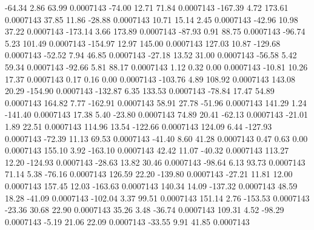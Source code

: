       -64.34        2.86       63.99     0.0007143
      -74.00       12.71       71.84     0.0007143
     -167.39        4.72      173.61     0.0007143
       37.85       11.86      -28.88     0.0007143
       10.71       15.14        2.45     0.0007143
      -42.96       10.98       37.22     0.0007143
     -173.14        3.66      173.89     0.0007143
      -87.93        0.91       88.75     0.0007143
      -96.74        5.23      101.49     0.0007143
     -154.97       12.97      145.00     0.0007143
      127.03       10.87     -129.68     0.0007143
      -52.52        7.94       46.85     0.0007143
      -27.18       13.52       31.00     0.0007143
      -56.58        5.42       59.34     0.0007143
      -92.66        5.81       88.17     0.0007143
        1.12        0.32        0.00     0.0007143
      -10.81       10.26       17.37     0.0007143
        0.17        0.16        0.00     0.0007143
     -103.76        4.89      108.92     0.0007143
      143.08       20.29     -154.90     0.0007143
     -132.87        6.35      133.53     0.0007143
      -78.84       17.47       54.89     0.0007143
      164.82        7.77     -162.91     0.0007143
       58.91       27.78      -51.96     0.0007143
      141.29        1.24     -141.40     0.0007143
       17.38        5.40      -23.80     0.0007143
       74.89       20.41      -62.13     0.0007143
      -21.01        1.89       22.51     0.0007143
      114.96       13.54     -122.66     0.0007143
      124.09        6.44     -127.93     0.0007143
      -72.39       11.13       69.53     0.0007143
      -41.40        8.60       41.28     0.0007143
        0.47        0.63        0.00     0.0007143
      155.10        3.92     -163.10     0.0007143
       42.42       11.07      -40.32     0.0007143
      113.27       12.20     -124.93     0.0007143
      -28.63       13.82       30.46     0.0007143
      -98.64        6.13       93.73     0.0007143
       71.14        5.38      -76.16     0.0007143
      126.59       22.20     -139.80     0.0007143
      -27.21       11.81       12.00     0.0007143
      157.45       12.03     -163.63     0.0007143
      140.34       14.09     -137.32     0.0007143
       48.59       18.28      -41.09     0.0007143
     -102.04        3.37       99.51     0.0007143
      151.14        2.76     -153.53     0.0007143
      -23.36       30.68       22.90     0.0007143
       35.26        3.48      -36.74     0.0007143
      109.31        4.52      -98.29     0.0007143
       -5.19       21.06       22.09     0.0007143
      -33.55        9.91       41.85     0.0007143
